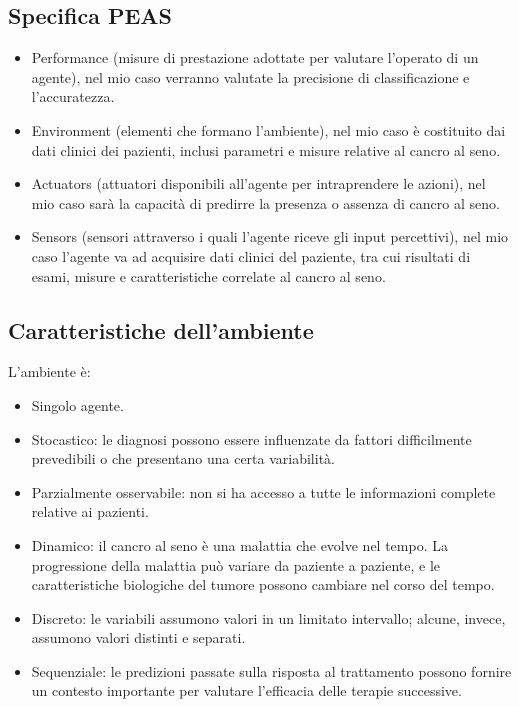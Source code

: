 \documentclass{article}
\begin{document}
\subsection{Specifica PEAS}
\begin{itemize}
    \item Performance (misure di prestazione adottate per valutare l’operato di un agente), nel mio caso
    verranno valutate la precisione di classificazione e l’accuratezza.
    \item Environment (elementi che formano l’ambiente), nel mio caso è costituito dai dati clinici dei pazienti, inclusi parametri e misure relative al cancro al seno.
    \item Actuators (attuatori disponibili all’agente per intraprendere le azioni), nel mio caso sarà la capacità di predirre la presenza o assenza di cancro al seno.
    \item Sensors (sensori attraverso i quali l’agente riceve gli input percettivi), nel mio caso l’agente va ad acquisire dati clinici del paziente, tra cui risultati di esami, misure e caratteristiche correlate al cancro al seno.
\end{itemize}

\subsection{Caratteristiche dell'ambiente}
L'ambiente è:
\begin{itemize}
    \item Singolo agente.
    \item Stocastico: le diagnosi possono essere influenzate da fattori  difficilmente prevedibili o che presentano una certa variabilità.
    \item Parzialmente osservabile: non si ha accesso a tutte le informazioni complete relative ai pazienti.
    \item Dinamico: il cancro al seno è una malattia che evolve nel tempo. La progressione della malattia può variare da paziente a paziente, e le caratteristiche biologiche del tumore possono cambiare nel corso del tempo.
    \item Discreto: le variabili assumono valori in un limitato intervallo; alcune, invece, assumono valori distinti e separati.
    \item Sequenziale: le predizioni passate sulla risposta al trattamento possono fornire un contesto importante per valutare l'efficacia delle terapie successive.
\end{itemize}
\end{document}
